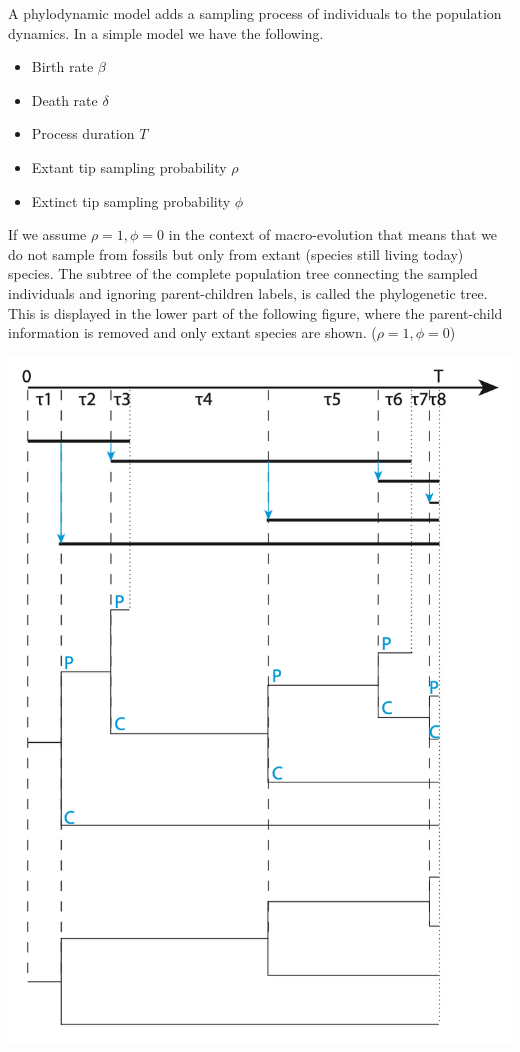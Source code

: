 \documentclass{article}
\begin{document}
\begin{multicols*}{3}
A phylodynamic model adds a sampling process of individuals to the population dynamics. In a simple model we have the following. 

\begin{itemize}
    \item Birth rate $\beta$
    \item Death rate $\delta$
    \item Process duration $T$
    \item Extant tip sampling probability $\rho$
    \item Extinct tip sampling probability $\phi$
\end{itemize}


If we assume $\rho = 1, \phi = 0$ in the context of macro-evolution that means that we do not sample from fossils but only from extant (species still living today) species. The subtree of the complete population tree connecting the sampled individuals and ignoring parent-children labels, is called the phylogenetic tree. This is displayed in the lower part of the following figure, where the parent-child information is removed and only extant species are shown. ($\rho = 1, \phi = 0$) 


\begin{center}
    \includegraphics[width=0.8\linewidth, angle=0.0]{extanttree.png}
\end{center}


\end{multicols*}
\end{document}
